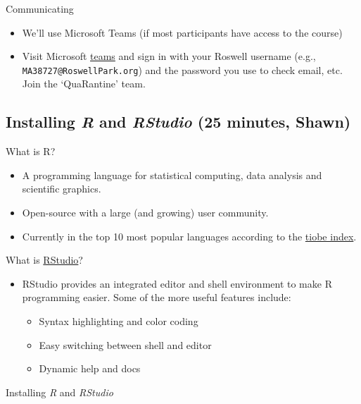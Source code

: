 \documentclass[
]{book}
\providecommand{\tightlist}{%
  \setlength{\itemsep}{0pt}\setlength{\parskip}{0pt}}
\begin{document}
Communicating

\begin{itemize}
\tightlist
\item
  We'll use Microsoft Teams (if most participants have access to the course)
\item
  Visit Microsoft \href{https://teams.microsoft.org}{teams} and sign in with your Roswell username (e.g., \texttt{MA38727@RoswellPark.org}) and the password you use to check email, etc. Join the `QuaRantine' team.
\end{itemize}

\hypertarget{installing-r-and-rstudio-25-minutes-shawn}{%
\subsection{\texorpdfstring{Installing \emph{R} and \emph{RStudio} (25 minutes, Shawn)}{Installing R and RStudio (25 minutes, Shawn)}}\label{installing-r-and-rstudio-25-minutes-shawn}}

What is R?

\begin{itemize}
\item
  A programming language for statistical computing, data analysis and scientific graphics.
\item
  Open-source with a large (and growing) user community.
\item
  Currently in the top 10 most popular languages according to the \href{https://www.tiobe.com/tiobe-index/}{tiobe index}.
\end{itemize}

What is \href{https://rstudio.com/}{RStudio}?

\begin{itemize}
\tightlist
\item
  RStudio provides an integrated editor and shell environment to make R programming easier. Some of the more useful features include:

  \begin{itemize}
  \tightlist
  \item
    Syntax highlighting and color coding
  \item
    Easy switching between shell and editor
  \item
    Dynamic help and docs
  \end{itemize}
\end{itemize}

Installing \emph{R} and \emph{RStudio}
\end{document}
